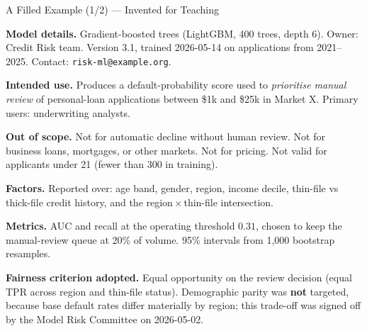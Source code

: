 \begin{frame}{A Filled Example (1/2) --- Invented for Teaching}

    \begin{tcolorbox}[colback=gray!4, colframe=raiBlue!60,
                      title={Model card --- \texttt{loan-default-v3}}, fonttitle=\bfseries]
        \scriptsize
        \textbf{Model details.} Gradient-boosted trees (LightGBM, 400 trees, depth 6). Owner:
        Credit Risk team. Version 3.1, trained 2026-05-14 on applications from 2021--2025.
        Contact: \texttt{risk-ml@example.org}.

        \vspace{0.35em}
        \textbf{Intended use.} Produces a default-probability score used to \emph{prioritise manual
        review} of personal-loan applications between \$1k and \$25k in Market X.
        Primary users: underwriting analysts.

        \vspace{0.35em}
        \textbf{Out of scope.} Not for automatic decline without human review. Not for business
        loans, mortgages, or other markets. Not for pricing. Not valid for applicants under 21
        (fewer than 300 in training).

        \vspace{0.35em}
        \textbf{Factors.} Reported over: age band, gender, region, income decile, thin-file vs
        thick-file credit history, and the region\,$\times$\,thin-file intersection.

        \vspace{0.35em}
        \textbf{Metrics.} AUC and recall at the operating threshold $0.31$, chosen to keep the
        manual-review queue at 20\% of volume. 95\% intervals from 1{,}000 bootstrap resamples.

        \vspace{0.35em}
        \textbf{Fairness criterion adopted.} Equal opportunity on the review decision
        (equal TPR across region and thin-file status). Demographic parity was
        \textbf{not} targeted, because base default rates differ materially by region;
        this trade-off was signed off by the Model Risk Committee on 2026-05-02.
    \end{tcolorbox}
\end{frame}

